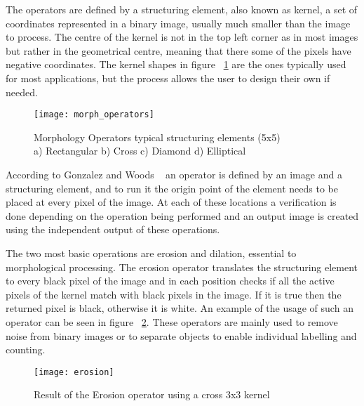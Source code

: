 The operators are defined by a structuring element, also known as kernel, a set of coordinates represented in a binary image, usually much smaller than the image to process. The centre of the kernel is not in the top left corner as in most images but rather in the geometrical centre, meaning that there some of the pixels have negative coordinates. The kernel shapes in figure ~\ref{fig:morh_operators} are the ones typically used for most applications, but the process allows the user to design their own if needed.

\begin{figure}[h]
  \begin{center}
    \leavevmode
    \texttt{[image: morph\_operators]}
    \captionsetup{justification=centering}
    \caption{Morphology Operators typical structuring elements (5x5)\\a) Rectangular b) Cross c) Diamond d) Elliptical}
    \label{fig:morh_operators}
  \end{center}
\end{figure}

According to Gonzalez and Woods ~\cite{gonzalez_digital_1992} an operator is defined by an image and a structuring element, and to run it the origin point of the element needs to be placed at every pixel of the image. At each of these locations a verification is done depending on the operation being performed and an output image is created using the independent output of these operations.

The two most basic operations are erosion and dilation, essential to morphological processing. The erosion operator translates the structuring element to every black pixel of the image and in each position checks if all the active pixels of the kernel match with black pixels in the image. If it is true then the returned pixel is black, otherwise it is white. An example of the usage of such an operator can be seen in figure ~\ref{fig:erosion}. These operators are mainly used to remove noise from binary images or to separate objects to enable individual labelling and counting.

\begin{figure}[h]
  \begin{center}
    \leavevmode
    \texttt{[image: erosion]}
    \captionsetup{justification=centering}
    \caption{Result of the Erosion operator using a cross 3x3 kernel}
    \label{fig:erosion}
  \end{center}
\end{figure}

